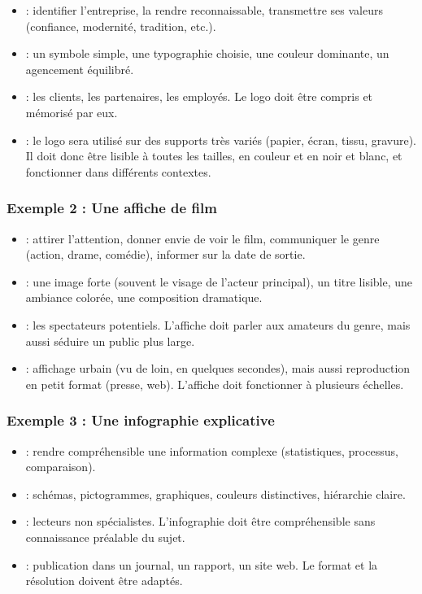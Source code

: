 \begin{itemize}
    \item {} : identifier l'entreprise, la rendre reconnaissable, transmettre ses valeurs (confiance, modernité, tradition, etc.).
    \item {} : un symbole simple, une typographie choisie, une couleur dominante, un agencement équilibré.
    \item {} : les clients, les partenaires, les employés. Le logo doit être compris et mémorisé par eux.
    \item {} : le logo sera utilisé sur des supports très variés (papier, écran, tissu, gravure). Il doit donc être lisible à toutes les tailles, en couleur et en noir et blanc, et fonctionner dans différents contextes.
\end{itemize}

\subsubsection{Exemple 2 : Une affiche de film}

\begin{itemize}
    \item {} : attirer l'attention, donner envie de voir le film, communiquer le genre (action, drame, comédie), informer sur la date de sortie.
    \item {} : une image forte (souvent le visage de l'acteur principal), un titre lisible, une ambiance colorée, une composition dramatique.
    \item {} : les spectateurs potentiels. L'affiche doit parler aux amateurs du genre, mais aussi séduire un public plus large.
    \item {} : affichage urbain (vu de loin, en quelques secondes), mais aussi reproduction en petit format (presse, web). L'affiche doit fonctionner à plusieurs échelles.
\end{itemize}

\subsubsection{Exemple 3 : Une infographie explicative}

\begin{itemize}
    \item {} : rendre compréhensible une information complexe (statistiques, processus, comparaison).
    \item {} : schémas, pictogrammes, graphiques, couleurs distinctives, hiérarchie claire.
    \item {} : lecteurs non spécialistes. L'infographie doit être compréhensible sans connaissance préalable du sujet.
    \item {} : publication dans un journal, un rapport, un site web. Le format et la résolution doivent être adaptés.
\end{itemize}

